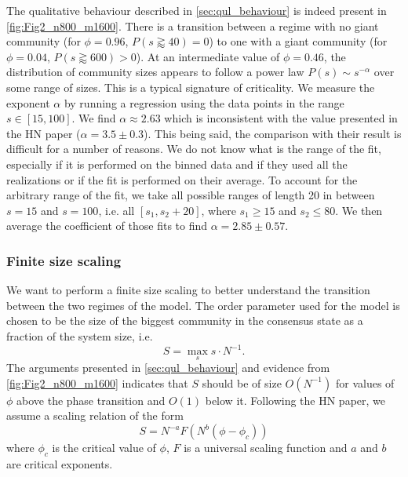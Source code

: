 \documentclass[11pt]{article}
\begin{document}
The qualitative behaviour described in \autoref{sec:qul_behaviour} is indeed present in \autoref{fig:Fig2_n800_m1600}. There is a transition between a regime with no giant community (for $\phi=0.96$, $P(s\gtrapprox40)=0$) to one with a giant community (for $\phi=0.04$, $P(s\gtrapprox600)>0$). At an intermediate value of $\phi=0.46$, the distribution of community sizes appears to follow a power law $P(s)\sim s^{-\alpha}$ over some range of sizes. This is a typical signature of criticality.  We measure the exponent $\alpha$ by running a regression using the data points in the range $s\in[15, 100]$. We find $\alpha\approx2.63$ which is inconsistent with the value presented in the HN paper ($\alpha=3.5 \pm 0.3$). This being said, the comparison with their result is difficult for a number of reasons. We do not know what is the range of the fit, especially if it is performed on the binned data and if they used all the realizations or if the fit is performed on their average. To account for the arbitrary range of the fit, we take all possible ranges of length 20 in between $s=15$ and $s=100$, i.e. all $[s_1, s_2+20]$, where $s_1\geq15$ and $s_2\leq80$. We then average the coefficient of those fits to find $\alpha=2.85 \pm 0.57$.

\subsubsection{Finite size scaling}
\label{sec:finite_size_scaling}
We want to perform a finite size scaling to better understand the transition between the two regimes of the model. The order parameter used for the model is chosen to be the size of the biggest community in the consensus state as a fraction of the system size, i.e.
\begin{equation}
    S = \max_s s\cdot N^{-1}.
\end{equation}
The arguments presented in \autoref{sec:qul_behaviour} and evidence from \autoref{fig:Fig2_n800_m1600} indicates that $S$ should be of size $O(N^{-1})$ for values of $\phi$ above the phase transition and $O(1)$ below it. Following the HN paper, we assume a scaling relation of the form 
\begin{equation}
\label{scaling}
S = N^{-a}F\left(N^b(\phi-\phi_c)\right)
\end{equation}
where $\phi_c$ is the critical value of $\phi$, $F$ is a universal scaling function and $a$ and $b$ are critical exponents.
\end{document}
